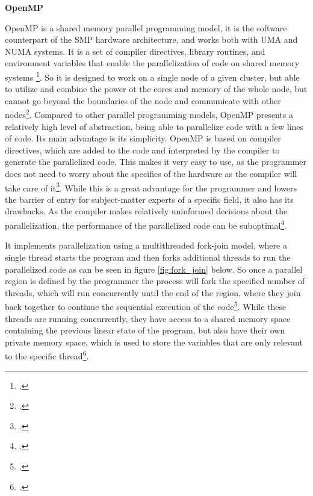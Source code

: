 \textbf{OpenMP}

OpenMP is a shared memory parallel programming model, it is the software counterpart of the \ac{SMP} hardware architecture, and works both with \ac{UMA} and \ac{NUMA} systems.
It is a set of compiler directives, library routines, and environment variables that enable the parallelization of code on shared memory systems \footcite{hermannsParallelProgrammingFortran}.
So it is designed to work on a single node of a given cluster, but able to utilize and combine the power ot the cores and memory of the whole node,
but cannot go beyond the boundaries of the node and communicate with other nodes\footcite{mitplasmascienceandfusioncenterIntroParallelProgramming2022}.
Compared to other parallel programming models, OpenMP presents a relatively high level of abstraction, being able to parallelize code with a few lines of code.
Its main advantage is its simplicity. OpenMP is based on compiler directives, which are added to the code and interpreted by the compiler to generate the parallelized code.
This makes it very easy to use, as the programmer does not need to worry about the specifics of the hardware as the compiler will take care of it\footcite{niklaswittmerParallelisierungMitOpenMP2018}.
While this is a great advantage for the programmer and lowers the barrier of entry for subject-matter experts of a specific field, it also has its drawbacks.
As the compiler makes relatively uninformed decisions about the parallelization, the performance of the parallelized code can be suboptimal\footcite{ruudvanderpasGettingOpenMPSpeed2014}.

It implements parallelization using a multithreaded fork-join model, where a single thread starts the program and then forks additional threads to run the parallelized code as can be seen in figure \ref{fig:fork_join} below.
So once a parallel region is defined by the programmer the process will fork the specified number of threads, which will run concurrently until the end of the region, where they join back together to continue the sequential execution of the code\footcite{laboratoryOpenMPProgrammingModel}.
While these threads are running concurrently, they have access to a shared memory space containing the previous linear state of the program,
but also have their own private memory space, which is used to store the variables that are only relevant to the specific thread\footcite{mitplasmascienceandfusioncenterIntroParallelProgramming2022}.

